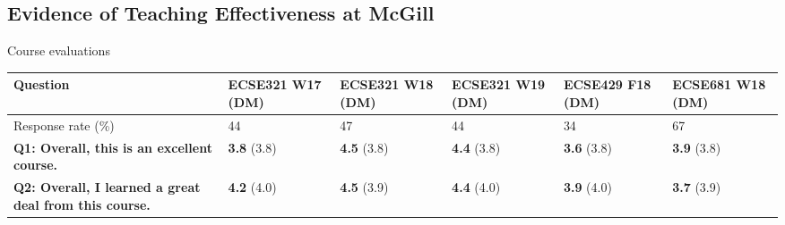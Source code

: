 \documentclass[a4paper,11pt]{article}
\begin{document}

\subsection{Evidence of Teaching Effectiveness at McGill}

Course evaluations

\begin{table}[htbp]
\footnotesize
\begin{tabular}{@{}p{8cm}p{1.3cm}p{1.3cm}p{1.3cm}p{1.3cm}p{1.3cm}@{}}
\toprule
\textbf{Question} & \textbf{ECSE321} \newline \textbf{W17} \newline \textbf{(DM)} & 
\textbf{ECSE321} \newline \textbf{W18} \newline \textbf{(DM)} & 
\textbf{ECSE321} \newline \textbf{W19} \newline \textbf{(DM)} & 
\textbf{ECSE429} \newline \textbf{F18} \newline \textbf{(DM)} & 
\textbf{ECSE681} \newline \textbf{W18} \newline \textbf{(DM)} \\ \toprule
Response rate (\%) & 44 & 47 & 44 & 34 & 67 \\ \midrule
\textbf{Q1: Overall, this is an excellent course.} & \textbf{3.8} \newline (3.8) & \textbf{4.5} \newline (3.8) & \textbf{4.4} \newline (3.8) & \textbf{3.6} \newline (3.8) & \textbf{3.9} \newline (3.8)  \\ \midrule

\textbf{Q2: Overall, I learned a great deal from this course.} & \textbf{4.2} \newline (4.0) & \textbf{4.5} \newline (3.9) & \textbf{4.4} \newline (4.0) & \textbf{3.9} \newline (4.0) & \textbf{3.7} \newline (3.9)  \\ \midrule


\end{tabular}
\end{table}
\end{document}

